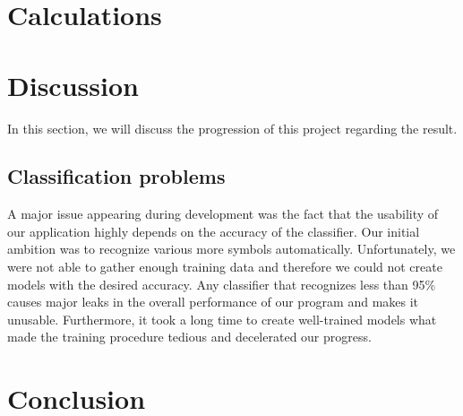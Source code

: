 \documentclass[12pt]{article}
\begin{document}
\section{Calculations}

\section{Discussion}
	In this section, we will discuss the progression of this project regarding the result.
	\subsection{Classification problems}
	A major issue appearing during development was the fact that the usability of our application highly depends on the accuracy of the classifier. Our initial ambition was to recognize various more symbols automatically. Unfortunately, we were not able to gather enough training data and therefore we could not create models with the desired accuracy. Any classifier that recognizes less than 95\% causes major leaks in the overall performance of our program and makes it unusable. Furthermore, it took a long time to create well-trained models what made the training procedure tedious and decelerated our progress.

\section{Conclusion}

\newpage
\printbibliography[heading=bibintoc, title={Sources}]
\end{document}
